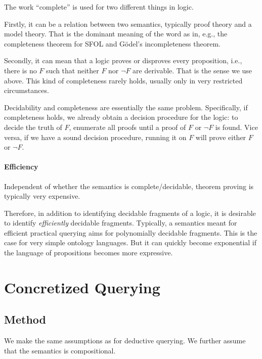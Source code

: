 \begin{remark}
The work ``complete'' is used for two different things in logic.

Firstly, it can be a relation between two semantics, typically proof theory and a model theory.
That is the dominant meaning of the word as in, e.g., the completeness theorem for SFOL and G\"odel's incompleteness theorem.

Secondly, it can mean that a logic proves or disproves every proposition, i.e., there is no $F$ such that neither $F$ nor $\neg F$ are derivable.
That is the sense we use above.
This kind of completeness rarely holds, usually only in very restricted circumstances.
\end{remark}

Decidability and completeness are essentially the same problem.
Specifically, if completeness holds, we already obtain a decision procedure for the logic: to decide the truth of $F$, enumerate all proofs until a proof of $F$ or $\neg F$ is found.
Vice versa, if we have a sound decision procedure, running it on $F$ will prove either $F$ or $\neg F$.

\paragraph{Efficiency}
Independent of whether the semantics is complete/decidable, theorem proving is typically very expensive.

Therefore, in addition to identifying decidable fragments of a logic, it is desirable to identify \emph{efficiently} decidable fragments.
Typically, a semantics meant for efficient practical querying aims for polynomially decidable fragments.
This is the case for very simple ontology languages.
But it can quickly become exponential if the language of propositions becomes more expressive.

\section{Concretized Querying}\label{sec:bolquery:conc}

\subsection{Method}

We make the same assumptions as for deductive querying.
We further assume that the semantics is compositional.

